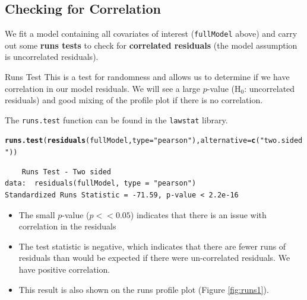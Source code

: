 \documentclass[11pt, a4paper]{article}
\makeatletter
\newcommand{\hlfunctioncall}[1]{\textcolor[rgb]{0.501960784313725,0,0.329411764705882}{\textbf{#1}}}%
\newcommand{\hlstring}[1]{\textcolor[rgb]{0.6,0.6,1}{#1}}%
\newenvironment{kframe}{%
 \def\at@end@of@kframe{}%
 \ifinner\ifhmode%
  \def\at@end@of@kframe{\end{minipage}}%
  \begin{minipage}{\columnwidth}%
 \fi\fi%
 \def\FrameCommand##1{\hskip\@totalleftmargin \hskip-\fboxsep
 \colorbox{shadecolor}{##1}\hskip-\fboxsep
     \hskip-\linewidth \hskip-\@totalleftmargin \hskip\columnwidth}%
 \MakeFramed {\advance\hsize-\width
   \@totalleftmargin\z@ \linewidth\hsize
   \@setminipage}}%
 {\par\unskip\endMakeFramed%
 \at@end@of@kframe}
\newenvironment{knitrout}{}{} %
\makeatother
\begin{document}
\subsection{Checking for Correlation}
\begin{frame}[fragile]
We fit a model containing all covariates of interest ({\tt fullModel} above) and carry out some \textbf{runs tests} to check for \textbf{correlated residuals} (the model assumption is uncorrelated residuals).

\begin{block}{Runs Test}
This is a test for randomness and allows us to determine if we have correlation in our model residuals. We will see a large $p$-value (H$_0$: uncorrelated residuals) and good mixing of the profile plot if there is no correlation.
\end{block}

\end{frame}


\begin{frame}[fragile]
\noindent The {\tt runs.test} function can be found in the {\tt lawstat} library.
\begin{knitrout}\footnotesize
{}\color{fgcolor}\begin{kframe}
\begin{alltt}
\hlfunctioncall{runs.test}(\hlfunctioncall{residuals}(fullModel, type = \hlstring{"pearson"}), alternative = \hlfunctioncall{c}(\hlstring{"two.sided"}))
\end{alltt}
\begin{verbatim}
	Runs Test - Two sided
data:  residuals(fullModel, type = "pearson") 
Standardized Runs Statistic = -71.59, p-value < 2.2e-16
\end{verbatim}
\end{kframe}
\end{knitrout}

\begin{itemize}
\item The small $p$-value ($p << 0.05$) indicates that there is an issue with correlation in the residuals
\item The test statistic is negative, which indicates that there are fewer runs of residuals than would be expected if there were un-correlated residuals.  We have positive correlation.
\item This result is also shown on the runs profile plot (Figure \ref{fig:runs1}).
\end{itemize}
\end{frame}
\end{document}
